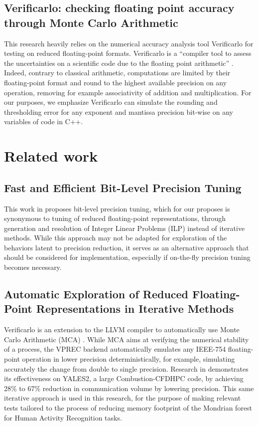 \documentclass[conference]{IEEEtran}
\begin{document}
\subsection{Verificarlo: checking floating point accuracy through Monte Carlo Arithmetic}

This research heavily relies on the numerical accuracy analysis tool Verificarlo
for testing on reduced floating-point formats. Verificarlo is a “compiler tool
to assess the uncertainties on a scientific code due to the floating point
arithmetic” \cite{denis2016verificarlo}. Indeed, contrary to classical
arithmetic, computations are limited by their floating-point format and round to
the highest available precision on any operation, removing for example
associativity of addition and multiplication. For our purposes, we emphasize
Verificarlo can simulate the rounding and thresholding error for any exponent
and mantissa precision bit-wise on any variables of code in C++.

\section{Related work}

\subsection{Fast and Efficient Bit-Level Precision Tuning}

This work in \cite{adje2021fast} proposes bit-level precision tuning, which for
our proposes is synonymous to tuning of reduced floating-point representations,
through generation and resolution of Integer Linear Problems (ILP) instead of
iterative methods. While this approach may not be adapted for exploration of the
behaviors latent to precision reduction, it serves as an alternative approach
that should be considered for implementation, especially if on-the-fly precision
tuning becomes necessary.

\subsection{Automatic Exploration of Reduced Floating-Point Representations in Iterative Methods}

Verificarlo is an extension to the LLVM compiler to automatically use Monte
Carlo Arithmetic (MCA) \cite{denis2016verificarlo}. While MCA aims at verifying
the numerical stability of a process, the VPREC backend automatically emulates
any IEEE-754 floating-point operation in lower precision deterministically, for
example, simulating accurately the change from double to single precision.
Research in \cite{chatelain2019automatic} demonstrates its effectiveness on
YALES2, a large Combustion-CFDHPC code, by achieving 28\% to 67\% reduction in
communication volume by lowering precision. This same iterative approach is used
in this research, for the purpose of making relevant tests tailored to the
process of reducing memory footprint of the Mondrian forest for Human Activity
Recognition tasks.
\end{document}
